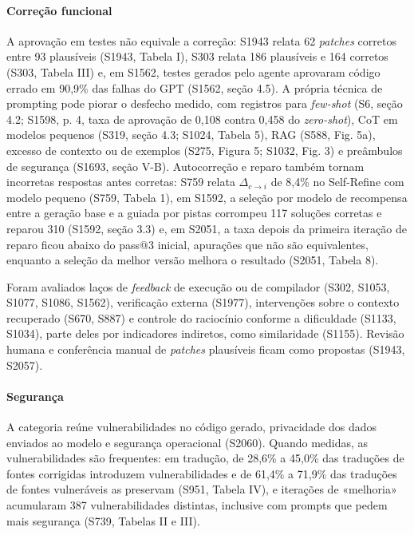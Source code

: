 \paragraph{Correção funcional}
A aprovação em testes não equivale a correção: S1943 relata 62 \textit{patches} corretos entre 93 plausíveis (S1943, Tabela I), S303 relata 186 plausíveis e 164 corretos (S303, Tabela III) e, em S1562, testes gerados pelo agente aprovaram código errado em 90,9\% das falhas do GPT (S1562, seção 4.5).
A própria técnica de prompting pode piorar o desfecho medido, com registros para \textit{few-shot} (S6, seção 4.2; S1598, p. 4, taxa de aprovação de 0,108 contra 0,458 do \textit{zero-shot}), CoT em modelos pequenos (S319, seção 4.3; S1024, Tabela 5), RAG (S588, Fig. 5a), excesso de contexto ou de exemplos (S275, Figura 5; S1032, Fig. 3) e preâmbulos de segurança (S1693, seção V-B).
Autocorreção e reparo também tornam incorretas respostas antes corretas: S759 relata $\Delta_{c \to i}$ de 8,4\% no Self-Refine com modelo pequeno (S759, Tabela 1), em S1592, a seleção por modelo de recompensa entre a geração base e a guiada por pistas corrompeu 117 soluções corretas e reparou 310 (S1592, seção 3.3) e, em S2051, a taxa depois da primeira iteração de reparo ficou abaixo do pass@3 inicial, apurações que não são equivalentes, enquanto a seleção da melhor versão melhora o resultado (S2051, Tabela 8).

Foram avaliados laços de \textit{feedback} de execução ou de compilador (S302, S1053, S1077, S1086, S1562), verificação externa (S1977), intervenções sobre o contexto recuperado (S670, S887) e controle do raciocínio conforme a dificuldade (S1133, S1034), parte deles por indicadores indiretos, como similaridade (S1155). Revisão humana e conferência manual de \textit{patches} plausíveis ficam como propostas (S1943, S2057).

\paragraph{Segurança}
A categoria reúne vulnerabilidades no código gerado, privacidade dos dados enviados ao modelo e segurança operacional (S2060).
Quando medidas, as vulnerabilidades são frequentes: em tradução, de 28,6\% a 45,0\% das traduções de fontes corrigidas introduzem vulnerabilidades e de 61,4\% a 71,9\% das traduções de fontes vulneráveis as preservam (S951, Tabela IV), e iterações de «melhoria» acumularam 387 vulnerabilidades distintas, inclusive com prompts que pedem mais segurança (S739, Tabelas II e III).


